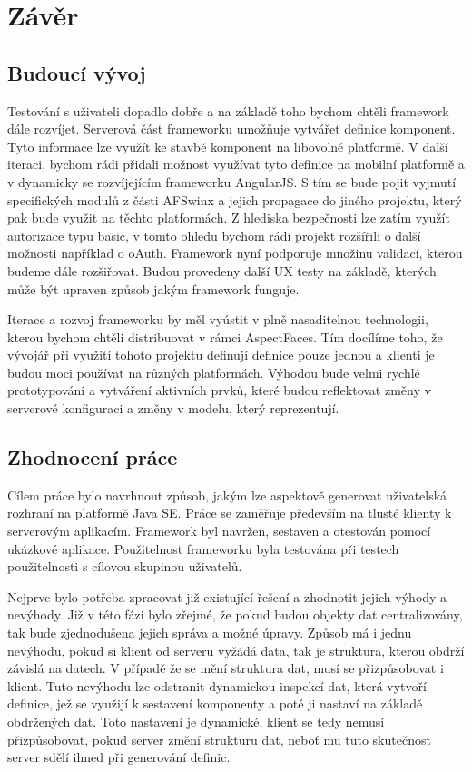\chapter{Závěr}
\section{Budoucí vývoj}
Testování s uživateli dopadlo dobře a na základě toho bychom chtěli framework dále rozvíjet. Serverová část frameworku umožňuje vytvářet definice komponent. Tyto informace lze využít ke stavbě komponent na libovolné platformě. V další iteraci, bychom rádi přidali možnost využívat tyto definice na mobilní platformě a v dynamicky se rozvíjejícím frameworku AngularJS. S tím se bude pojit vyjmutí specifických modulů z části AFSwinx a jejich propagace do jiného projektu, který pak bude využit na těchto platformách. Z hlediska bezpečnosti lze zatím využít autorizace typu basic, v tomto ohledu bychom rádi projekt rozšířili o další možnosti například o oAuth. Framework nyní podporuje množinu validací, kterou budeme dále rozšiřovat. Budou provedeny další UX testy na základě, kterých může být upraven způsob jakým framework funguje.

Iterace a rozvoj frameworku by měl vyústit v plně nasaditelnou technologii, kterou bychom chtěli distribuovat v rámci AspectFaces. Tím docílíme toho, že vývojář při využití tohoto projektu definují definice pouze jednou a klienti je budou moci používat na různých platformách. Výhodou bude velmi rychlé prototypování a vytváření aktivních prvků, které budou reflektovat změny v serverové konfiguraci a změny v modelu, který reprezentují.
\section{Zhodnocení práce}
Cílem práce bylo navrhnout způsob, jakým lze aspektově generovat uživatelská rozhraní na platformě Java SE. Práce se zaměřuje především na tlusté klienty k serverovým aplikacím. Framework byl navržen, sestaven a otestován pomocí ukázkové aplikace. Použitelnost frameworku byla testována při testech použitelnosti s cílovou skupinou uživatelů.

Nejprve bylo potřeba zpracovat již existující řešení a zhodnotit jejich výhody a nevýhody. Již v této fázi bylo zřejmé, že pokud budou objekty dat centralizovány, tak bude zjednodušena jejich správa a možné úpravy. Způsob má i jednu nevýhodu, pokud si klient od serveru vyžádá data, tak je struktura, kterou obdrží závislá na datech. V případě že se mění struktura dat, musí se přizpůsobovat i klient. Tuto nevýhodu lze odstranit dynamickou inspekcí dat, která vytvoří definice, jež se využijí k sestavení komponenty a poté ji nastaví na základě obdržených dat. Toto nastavení je dynamické, klient se tedy nemusí přizpůsobovat, pokud server změní strukturu dat, neboť mu tuto skutečnost server sdělí ihned při generování definic.

